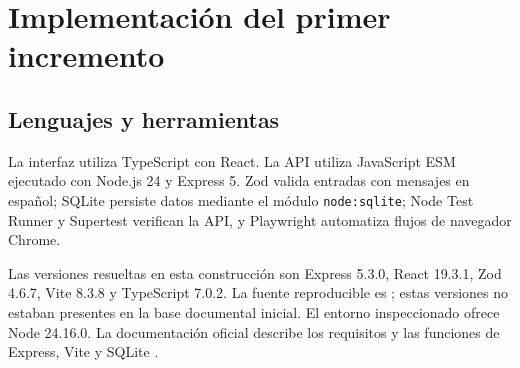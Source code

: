 \chapter{Implementación del primer incremento}
\section{Lenguajes y herramientas}
La interfaz utiliza TypeScript con React. La API utiliza JavaScript ESM ejecutado con Node.js 24 y Express 5. Zod valida entradas con mensajes en español; SQLite persiste datos mediante el módulo \texttt{node:sqlite}; Node Test Runner y Supertest verifican la API, y Playwright automatiza flujos de navegador Chrome.

Las versiones resueltas en esta construcción son Express 5.3.0, React 19.3.1, Zod 4.6.7, Vite 8.3.8 y TypeScript 7.0.2. La fuente reproducible es ; estas versiones no estaban presentes en la base documental inicial. El entorno inspeccionado ofrece Node 24.16.0. La documentación oficial describe los requisitos y las funciones de Express, Vite y SQLite \cite{express5,vite,nodesqlite}.

